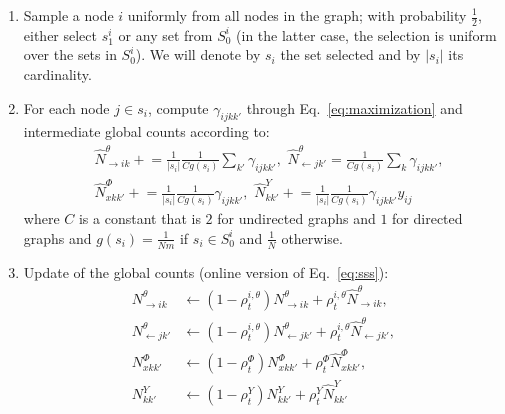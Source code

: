 \begin{enumerate}
\item Sample a node $i$ uniformly from all nodes in the graph; with probability $\frac{1}{2}$, either select $s_1^i$ or any set from $S_0^i$ (in the latter case, the selection is uniform over the sets in $S_0^i$). We will denote by $s_i$ the set selected and by $|s_i|$ its cardinality.
\item For each node $j \in s_i$, compute $\gamma_{ijkk'}$ through Eq.~\ref{eq:maximization} and intermediate global counts according to:
{\scriptsize
\begin{align*}
&\hat N^{\theta}_{\rightarrow ik} \mathrel{+}= \frac{1}{|s_i|} \frac{1}{Cg(s_i)} \sum_{k'} \gamma_{ijkk'}, \,\, \hat N^{\theta}_{\leftarrow jk'} = \frac{1}{Cg(s_i)} \sum_{k} \gamma_{ijkk'}, \\
&\hat N^{\Phi}_{xkk'} \mathrel{+}= \frac{1}{|s_i|} \frac{1}{Cg(s_i)} \gamma_{ijkk'}, \,\, \hat N^{{Y}}_{kk'} \mathrel{+}= \frac{1}{|s_i|} \frac{1}{Cg(s_i)} \gamma_{ijkk'} y_{ij}
\end{align*}
}
where $C$ is a constant that is $2$ for undirected graphs and $1$ for directed graphs and $g(s_i) = \frac{1}{Nm}$ if $s_i \in S_0^i$ and $\frac{1}{N}$ otherwise.
\item Update of the global counts (online version of Eq.~\ref{eq:sss}): 
{\scriptsize
\begin{align*}
N^{\theta}_{\rightarrow ik} &\leftarrow (1 - \rho^{i,\theta}_t) N^{\theta}_{\rightarrow ik} + \rho^{i,\theta}_t \hat N^{\theta}_{\rightarrow ik}, \\
N^{\theta}_{\leftarrow jk'} &\leftarrow (1 - \rho^{i,\theta}_t) N^{\theta}_{\leftarrow jk'} + \rho^{i,\theta}_t \hat N^{\theta}_{\leftarrow jk'}, \\
N^{\Phi}_{xkk'} &\leftarrow (1 - \rho^{\Phi}_t) N^{\Phi}_{xkk'} + \rho^{\Phi}_t \hat N^{\Phi}_{xkk'}, \\
N^{{Y}}_{kk'} &\leftarrow (1 - \rho^{{Y}}_t) N^{{Y}}_{kk'} + \rho^{{Y}}_t \hat N^{{Y}}_{kk'}
\end{align*}
}
\end{enumerate}
